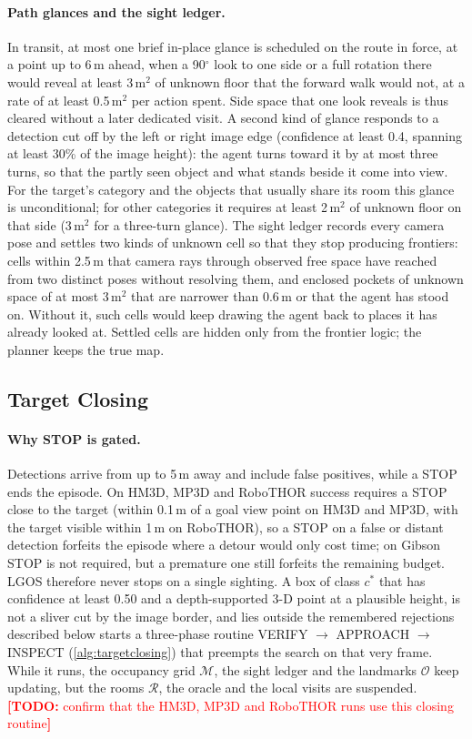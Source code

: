 \documentclass[10pt]{article}
\newcommand{\TODO}[1]{\textcolor{red}{\textbf{[TODO:} #1\textbf{]}}}
\newcommand{\ours}{LGOS\xspace}
\newcommand{\M}{\mathcal{M}}
\newcommand{\Ob}{\mathcal{O}}
\newcommand{\R}{\mathcal{R}}
\newcommand{\cstar}{c^{*}}
\begin{document}
\paragraph{Path glances and the sight ledger.}
In transit, at most one brief in-place glance is scheduled on the route in force, at a point up to 6\,m ahead, when a
90$^\circ$ look to one side or a full rotation there would reveal at least 3\,m$^2$ of unknown floor that the forward
walk would not, at a rate of at least 0.5\,m$^2$ per action spent. Side space that one look reveals is thus cleared
without a later dedicated visit. A second kind of glance responds to a detection cut off by the left or right image
edge (confidence at least 0.4, spanning at least 30\% of the image height): the agent turns toward it by at most three
turns, so that the partly seen object and what stands beside it come into view. For the target's category and the
objects that usually share its room this glance is unconditional; for other categories it requires at least 2\,m$^2$
of unknown floor on that side (3\,m$^2$ for a three-turn glance). The sight ledger records every camera pose and settles two kinds of unknown cell so
that they stop producing frontiers: cells within 2.5\,m that camera rays through observed free space have reached from
two distinct poses without resolving them, and enclosed pockets of unknown space of at most 3\,m$^2$ that are
narrower than 0.6\,m or that the agent has stood on. Without it, such
cells would keep drawing the agent back to places it has already looked at. Settled cells are hidden only from the
frontier logic; the planner keeps the true map.

\subsection{Target Closing}
\label{sec:execution-closing}

\paragraph{Why STOP is gated.}
Detections arrive from up to 5\,m away and include false positives, while a STOP ends the episode. On HM3D, MP3D and
RoboTHOR success requires a STOP close to the target (within 0.1\,m of a goal view point on HM3D and MP3D, with the
target visible within 1\,m on RoboTHOR), so a STOP on a false or distant detection forfeits the episode
where a detour would only cost time; on Gibson STOP is not required, but a premature one still forfeits the remaining
budget. \ours therefore never stops on a single sighting. A box of class $\cstar$ that has confidence at least 0.50
and a depth-supported 3-D point at a plausible height, is not a sliver cut by the image border, and lies outside the
remembered rejections described below starts a three-phase routine VERIFY $\rightarrow$ APPROACH $\rightarrow$ INSPECT
(\cref{alg:targetclosing}) that preempts the search on that very frame. While it runs, the occupancy grid $\M$, the
sight ledger and the landmarks $\Ob$ keep updating, but the rooms $\R$, the oracle and the local visits are suspended.
\TODO{confirm that the HM3D, MP3D and RoboTHOR runs use this closing routine}
\end{document}
